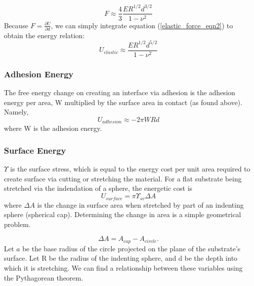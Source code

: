 \begin{equation}
F \approx \frac{4}{3}\frac{ER^{1/2}d^{3/2}}{1-\nu^2}
\label{elastic_force_eqn2}
\end{equation}
Because $F = \frac{\partial U}{\partial d}$, we can simply integrate equation (\ref{elastic_force_eqn2}) to obtain the energy relation:
\begin{equation}
\label{elastic_energy}
U_{elastic} \approx  \frac{ER^{1/2}d^{5/2}}{1-\nu^2}
\end{equation}


\subsubsection{Adhesion Energy}
The free energy change on creating an interface via adhesion is the adhesion energy per area, W multiplied by the surface area in contact (as found above). Namely,
\begin{equation}
\label{W_energy}
U_{adhesion} \approx -2\pi W R d 
\end{equation}
where W is the adhesion energy. 

\subsubsection{Surface Energy}
$\Upsilon$ is the surface stress, which is equal to the energy cost per unit area required to create surface via cutting or stretching the material. For a flat substrate being stretched via the indendation of a sphere, the energetic cost is
\begin{equation}
\label{generic_surface_energy}
U_{surface} = \pi \Upsilon_{sv}\Delta A
\end{equation}
where $\Delta A$ is the change in surface area when stretched by part of an indenting sphere (spherical cap). Determining the change in area is a simple geometrical problem.

\begin{equation}
\Delta A = A_{cap} - A_{circle}. 
\end{equation}
Let $ a $ be the base radius of the circle projected on the plane of the substrate's surface. Let R be the radius of the indenting sphere, and d be the depth into which it is stretching. We can find a relationship between these variables using the Pythagorean theorem.

